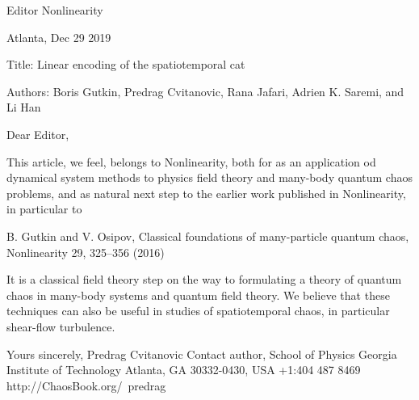 
        Editor
        Nonlinearity

                                            Atlanta, Dec 29 2019

Title:
    Linear encoding of the spatiotemporal cat

Authors:
    Boris Gutkin,
    Predrag Cvitanovic,
    Rana Jafari,
    Adrien K. Saremi,
         and
    Li Han

Dear Editor,

This article, we feel, belongs to Nonlinearity, both for as
an application od dynamical system methods to physics field theory
and many-body quantum chaos problems, and as natural next step
to the earlier work published in Nonlinearity, in particular to

    B. Gutkin and V. Osipov,
    Classical foundations of many-particle quantum chaos,
    Nonlinearity 29, 325–356 (2016)

It is a classical field theory step on the way to formulating a theory of
quantum chaos in many-body systems and quantum field theory.
We believe that these techniques can also be useful in studies
of spatiotemporal chaos, in particular shear-flow turbulence.

Yours sincerely,
   Predrag Cvitanovic
        Contact author,
        School of Physics
        Georgia Institute of Technology
        Atlanta, GA 30332-0430, USA
        +1:404 487 8469
        http://ChaosBook.org/~predrag
